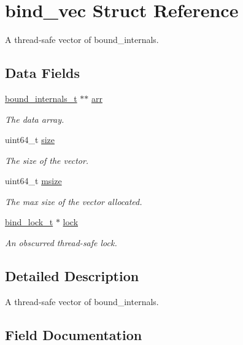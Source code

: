 \hypertarget{structbind__vec}{}\section{bind\+\_\+vec Struct Reference}
\label{structbind__vec}


A thread-\/safe vector of bound\+\_\+internals.  


\subsection*{Data Fields}
\begin{DoxyCompactItemize}
\item 
\hyperlink{structbound__internals__t}{bound\+\_\+internals\+\_\+t} $\ast$$\ast$ \hyperlink{structbind__vec_a8bf39e88ad9a1715c7e6cfa4fa8028f4}{arr}
\begin{DoxyCompactList}\small\item\em The data array. \end{DoxyCompactList}\item 
uint64\+\_\+t \hyperlink{structbind__vec_a322fa9fd253719971508bf013a668a64}{size}
\begin{DoxyCompactList}\small\item\em The size of the vector. \end{DoxyCompactList}\item 
uint64\+\_\+t \hyperlink{structbind__vec_aa45fa0f2e32261123f693541f26fc12b}{msize}
\begin{DoxyCompactList}\small\item\em The max size of the vector allocated. \end{DoxyCompactList}\item 
\hyperlink{structbind__lock__t}{bind\+\_\+lock\+\_\+t} $\ast$ \hyperlink{structbind__vec_af6053d8f0d9be5d8b03ffbc06f30c0a5}{lock}
\begin{DoxyCompactList}\small\item\em An obscurred thread-\/safe lock. \end{DoxyCompactList}\end{DoxyCompactItemize}


\subsection{Detailed Description}
A thread-\/safe vector of bound\+\_\+internals. 

\subsection{Field Documentation}
